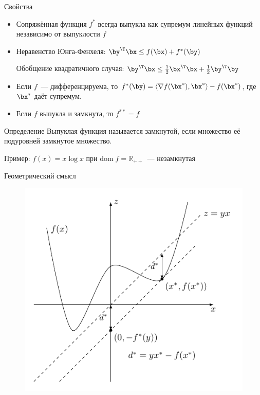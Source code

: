 \documentclass[12pt]{beamer}
\begin{document}
\begin{frame}{Свойства}
\begin{itemize}
\item Сопряжённая функция $f^*$ всегда выпукла как супремум линейных функций независимо от выпуклости $f$
\item Неравенство Юнга-Фенхеля: $\by^{\T}\bx \leq f(\bx) + f^*(\by)$

Обобщение квадратичного случая: $\by^{\T}\bx \leq \frac{1}{2}\bx^{\T}\bx + \frac{1}{2}\by^{\T}\by$
\item Если $f$~--- дифференцируема, то $f^*(\by) = \langle \nabla f(\bx^*), \bx^* \rangle - f(\bx^*)$, где $\bx^*$ даёт супремум.
\item Если $f$ выпукла и замкнута, то $f^{**} = f$
\end{itemize}

\begin{block}{Определение}
Выпуклая функция называется замкнутой, если множество её подуровней замкнутое множество.

Пример: $f(x) = x\log x$ при $\mathrm{dom} \; f = \mathbb{R}_{++}$~--- незамкнутая
\end{block}

\end{frame}

\begin{frame}{Геометрический смысл}
\begin{figure}
\includegraphics[scale=1]{geom.pdf}
\end{figure}
\end{frame}
\end{document}
